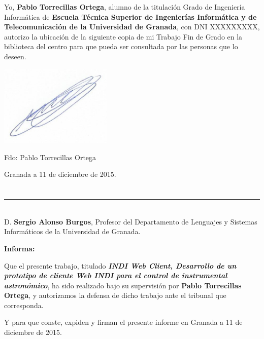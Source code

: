 Yo, \textbf{Pablo Torrecillas Ortega}, alumno de la titulación Grado de Ingeniería Informática de  \textbf{Escuela Técnica Superior
de Ingenierías Informática y de Telecomunicación de la Universidad de Granada}, con DNI XXXXXXXXX, autorizo la
ubicación de la siguiente copia de mi Trabajo Fin de Grado en la biblioteca del centro para que pueda ser
consultada por las personas que lo deseen.

\vspace{1cm}
\includegraphics[width=0.4\textwidth]{./imagenes/firmaPablo}

\noindent Fdo: Pablo Torrecillas Ortega

\vspace{2cm}

\begin{flushright}
Granada a 11 de diciembre de 2015.
\end{flushright}


\chapter*{}
\thispagestyle{empty}

\noindent\rule[-1ex]{\textwidth}{2pt}\\[4.5ex]

D. \textbf{Sergio Alonso Burgos}, Profesor del Departamento de Lenguajes y Sistemas Informáticos de la Universidad de Granada.

\vspace{0.5cm}

\textbf{Informa:}

\vspace{0.5cm}

Que el presente trabajo, titulado \textit{\textbf{INDI Web Client, Desarrollo de un prototipo de cliente Web INDI para el control de instrumental astronómico}},
ha sido realizado bajo su supervisión por \textbf{Pablo Torrecillas Ortega}, y autorizamos la defensa de dicho trabajo ante el tribunal
que corresponda.

\vspace{0.5cm}

Y para que conste, expiden y firman el presente informe en Granada a 11 de diciembre de 2015.

